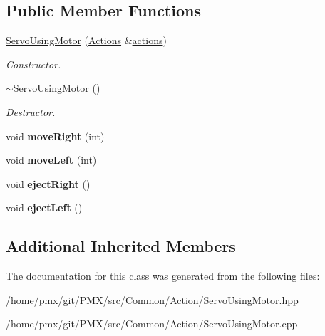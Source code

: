 \subsection*{Public Member Functions}
\begin{DoxyCompactItemize}
\item 
\mbox{\label{classServoUsingMotor_a71b1bfd6fe481a69e7f95481e7f889ce}} 
\hyperlink{classServoUsingMotor_a71b1bfd6fe481a69e7f95481e7f889ce}{Servo\+Using\+Motor} (\hyperlink{classActions}{Actions} \&\hyperlink{classAActionsElement_a3fbd5b8201049a59602d8b7201a9ef8a}{actions})
\begin{DoxyCompactList}\small\item\em Constructor. \end{DoxyCompactList}\item 
\mbox{\label{classServoUsingMotor_a39636d7706c611c5956cd3ee05517d79}} 
\hyperlink{classServoUsingMotor_a39636d7706c611c5956cd3ee05517d79}{$\sim$\+Servo\+Using\+Motor} ()
\begin{DoxyCompactList}\small\item\em Destructor. \end{DoxyCompactList}\item 
\mbox{\label{classServoUsingMotor_a748fce339b46b75854b6eb1e2b75e9b3}} 
void {\bfseries move\+Right} (int)
\item 
\mbox{\label{classServoUsingMotor_a299f53fdeeb24b2ebbe255c56687fc49}} 
void {\bfseries move\+Left} (int)
\item 
\mbox{\label{classServoUsingMotor_af8e964f88dc18e3fec9863e15c0e5219}} 
void {\bfseries eject\+Right} ()
\item 
\mbox{\label{classServoUsingMotor_adcdf6620f2ef5736e6e8d075fdd35998}} 
void {\bfseries eject\+Left} ()
\end{DoxyCompactItemize}
\subsection*{Additional Inherited Members}


The documentation for this class was generated from the following files\+:\begin{DoxyCompactItemize}
\item 
/home/pmx/git/\+P\+M\+X/src/\+Common/\+Action/Servo\+Using\+Motor.\+hpp\item 
/home/pmx/git/\+P\+M\+X/src/\+Common/\+Action/Servo\+Using\+Motor.\+cpp\end{DoxyCompactItemize}
